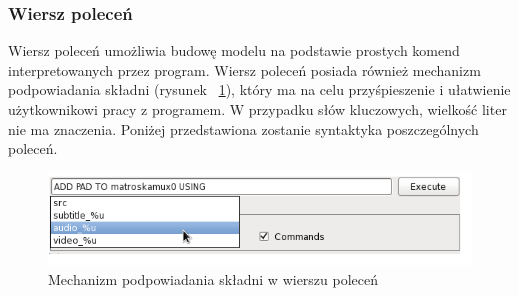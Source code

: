 \documentclass[12pt]{article}
\begin{document}
\subsubsection{Wiersz poleceń}
Wiersz poleceń umożliwia budowę modelu na podstawie prostych komend interpretowanych przez program. Wiersz poleceń posiada również mechanizm podpowiadania składni (rysunek ~\ref{fig:commandLine}), który ma na celu przyśpieszenie i ułatwienie użytkownikowi pracy z programem. W przypadku słów kluczowych, wielkość liter nie ma znaczenia. Poniżej przedstawiona zostanie syntaktyka poszczególnych poleceń. 
\begin{figure}[H]
  \includegraphics[width=140mm]{img/command-line.png}
  \caption{Mechanizm podpowiadania składni w wierszu poleceń}
  \label{fig:commandLine}
\end{figure}
\end{document}
